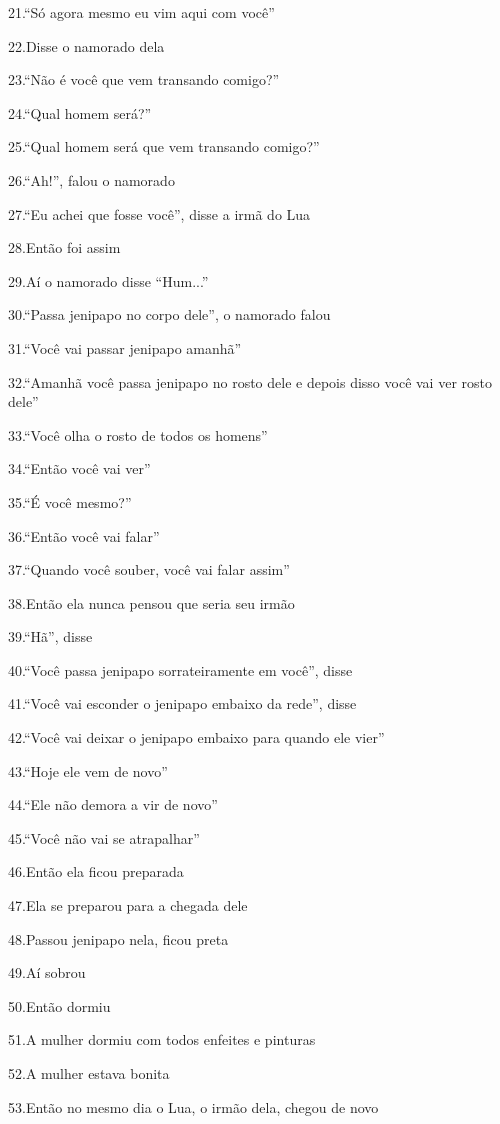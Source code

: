 21.``Só agora mesmo eu vim aqui com você''

22.Disse o namorado dela

23.``Não é você que vem transando comigo?''

24.``Qual homem será?''

25.``Qual homem será que vem transando comigo?''

26.``Ah!'', falou o namorado

27.``Eu achei que fosse você'', disse a irmã do Lua

28.Então foi assim

29.Aí o namorado disse ``Hum...''

30.``Passa jenipapo no corpo dele'', o namorado falou

31.``Você vai passar jenipapo amanhã''

32.``Amanhã você passa jenipapo no rosto dele e depois disso você vai
ver rosto dele''

33.``Você olha o rosto de todos os homens''

34.``Então você vai ver''

35.``É você mesmo?''

36.``Então você vai falar''

37.``Quando você souber, você vai falar assim''

38.Então ela nunca pensou que seria seu irmão

39.``Hã'', disse

40.``Você passa jenipapo sorrateiramente em você'', disse

41.``Você vai esconder o jenipapo embaixo da rede'', disse

42.``Você vai deixar o jenipapo embaixo para quando ele vier''

43.``Hoje ele vem de novo''

44.``Ele não demora a vir de novo''

45.``Você não vai se atrapalhar''

46.Então ela ficou preparada

47.Ela se preparou para a chegada dele

48.Passou jenipapo nela, ficou preta

49.Aí sobrou

50.Então dormiu

51.A mulher dormiu com todos enfeites e pinturas

52.A mulher estava bonita

53.Então no mesmo dia o Lua, o irmão dela, chegou de novo

